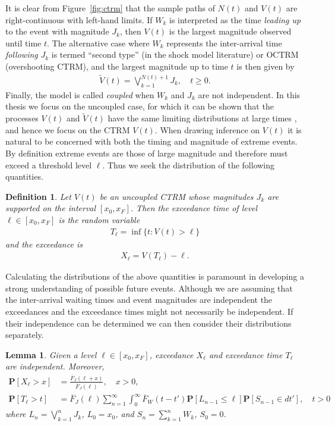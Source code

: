 \documentclass[honours,12pt]{unswthesis}
\newcommand{\pr}{\mathbf {P}}
\newcommand{\1}{\mathbf 1}
\newtheorem{lemma}[equation]{Lemma}
\newtheorem{definition}[equation]{Definition}
\numberwithin{equation}{section}
\theoremstyle{definition}
\theoremstyle{remark}
\begin{document}
It is clear from Figure~\ref{fig:ctrm} that the sample paths of $N(t)$ and $V(t)$ are right-continuous
with left-hand limits. 
If $W_k$ is interpreted as the time \emph{leading up} to the event with magnitude
$J_k$, then $V(t)$ is the largest magnitude observed until time $t$.
The alternative case where $W_k$ represents the inter-arrival time 
\textit{following} $J_k$ 
is termed ``second type'' (in the shock model literature) or OCTRM
(overshooting CTRM), and the largest magnitude up to time $t$ is then
given by
\begin{align}
\tilde V(t) = \bigvee_{k=1}^{N(t)+1} J_k, \quad t \ge 0.
\end{align}
Finally, the model is called \emph{coupled} when $W_k$ and $J_k$ are not independent.
In this thesis we focus on the uncoupled case,  
for which it can be shown that the processes $V(t)$ and
$\tilde V(t)$ have the same limiting distributions at large times
\cite{Hees2015}, and hence we focus on the CTRM $V(t)$. When drawing inference on $V(t)$ it is natural to be concerned with both the timing and magnitude of extreme events. By definition extreme events are those of large magnitude and therefore must exceed a threshold level $\ell$. Thus we seek the distribution of the following quantities.\\
\begin{definition}
Let $V(t)$ be an uncoupled CTRM whose magnitudes $J_k$ are supported on the interval
$[x_0, x_F]$.  Then the exceedance time of level $\ell \in [x_0,x_F]$ is
the random variable
\begin{align*}
T_\ell = \inf\{t: V(t) > \ell\}
\end{align*}
and the exceedance is 
\begin{align*}
X_\ell = V(T_\ell) - \ell.
\end{align*}
\end{definition}
Calculating the distributions of the above quantities is paramount in developing a strong understanding of possible future events. Although we are assuming that the inter-arrival waiting times and event magnitudes are independent the exceedances and the exceedance times might not necessarily be independent. If their independence can be determined we can then consider their distributions separately.
\begin{lemma}\label{lem:independence}
Given a level $\ell \in [x_0,x_F]$, exceedance $X_\ell$ and exceedance time
$T_\ell$ are independent. Moreover, 
\begin{align*}
\pr[X_\ell > x]
&= \frac{\overline F_J(\ell + x)}{\overline F_J(\ell)}, \quad x > 0,
\\
\pr[T_\ell > t]
&= \overline F_J(\ell) \sum_{n=1}^\infty \int_0^\infty \overline F_W(t-t') \pr[L_{n-1} \le \ell]
\pr[S_{n-1} \in dt'], \quad t > 0
\end{align*}
where $L_n = \bigvee_{k=1}^n J_k$, $L_0 = x_0$, and $S_n = \sum_{k=1}^n W_k$,
$S_0 = 0$.
\end{lemma}
\end{document}
